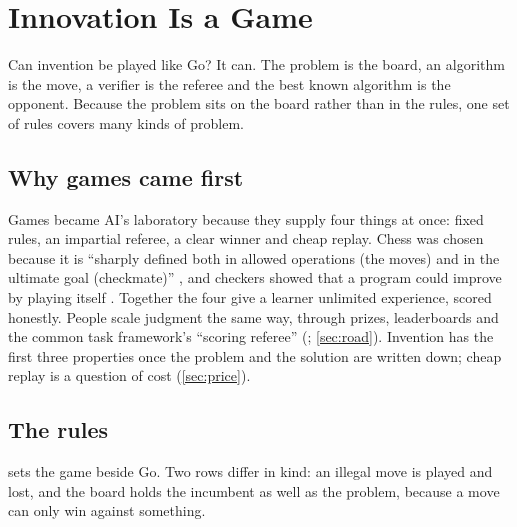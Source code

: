 \section{Innovation Is a Game}\label{sec:game}

Can invention be played like Go? It can. The problem is the board, an
algorithm is the move, a verifier is the referee and the best known algorithm
is the opponent. Because the problem sits on the board rather than in the
rules, one set of rules covers many kinds of problem.

\subsection{Why games came first}\label{sub:game-games}

Games became AI's laboratory because they supply four things at once: fixed
rules, an impartial referee, a clear winner and cheap replay. Chess was chosen
because it is ``sharply defined both in allowed operations (the moves) and in
the ultimate goal (checkmate)'' \citep{shannon1950chess}, and checkers showed
that a program could improve by playing itself \citep{samuel1959checkers}.
Together the four give a learner unlimited experience, scored honestly. People
scale judgment the same way, through prizes, leaderboards and the common task
framework's ``scoring referee'' (\citealp{donoho2017fifty}; \cref{sec:road}).
Invention has the first three properties once the problem and the solution are
written down; cheap replay is a question of cost (\cref{sec:price}).

\subsection{The rules}\label{sub:game-rules}

 sets the game beside Go. Two rows differ in kind:
an illegal move is played and lost, and the board holds the incumbent as well as
the problem, because a move can only win against something.

